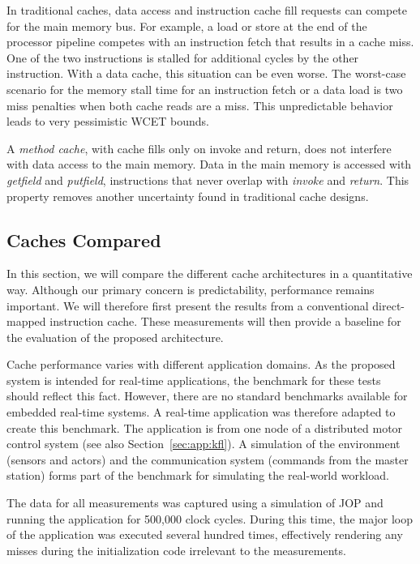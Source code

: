 In traditional caches, data access and instruction cache fill
requests can compete for the main memory bus. For example, a load or
store at the end of the processor pipeline competes with an
instruction fetch that results in a cache miss. One of the two
instructions is stalled for additional cycles by the other
instruction. With a data cache, this situation can be even worse.
The worst-case scenario for the memory stall time for an instruction
fetch or a data load is two miss penalties when both cache reads are
a miss. This unpredictable behavior leads to very pessimistic WCET
bounds.

A \emph{method cache}, with cache fills only on invoke and return,
does not interfere with data access to the main memory. Data in the
main memory is accessed with \emph{getfield} and \emph{putfield},
instructions that never overlap with \emph{invoke} and
\emph{return}. This property removes another uncertainty found in
traditional cache designs.


\subsection{Caches Compared}

In this section, we will compare the different cache architectures
in a quantitative way. Although our primary concern is
predictability, performance remains important. We will therefore
first present the results from a conventional direct-mapped
instruction cache. These measurements will then provide a baseline
for the evaluation of the proposed architecture.

Cache performance varies with different application domains. As the
proposed system is intended for real-time applications, the
benchmark for these tests should reflect this fact. However, there
are no standard benchmarks available for embedded real-time systems.
A real-time application was therefore adapted to create this
benchmark. The application is from one node of a distributed motor
control system \cite{jop:wises03} (see also
Section~\ref{sec:app:kfl}). A simulation of the environment (sensors
and actors) and the communication system (commands from the master
station) forms part of the benchmark for simulating the real-world
workload.

The data for all measurements was captured using a simulation of JOP
and running the application for 500,000 clock cycles. During this
time, the major loop of the application was executed several hundred
times, effectively rendering any misses during the initialization
code irrelevant to the measurements.

